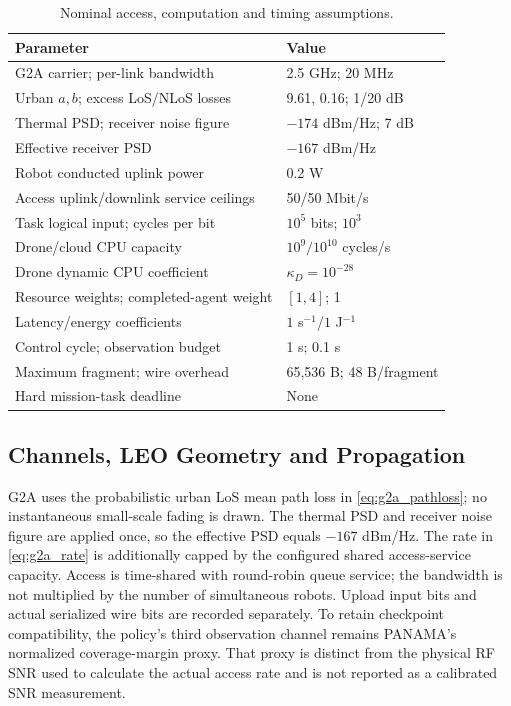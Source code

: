 \begin{table}[t]
\centering\caption{Nominal access, computation and timing assumptions.}
\label{tab:nominal_parameters}\scriptsize
\begin{tabular}{@{}p{}p{}@{}}
\toprule Parameter & Value\\\midrule
G2A carrier; per-link bandwidth & 2.5 GHz; 20 MHz\\
Urban $a,b$; excess LoS/NLoS losses & 9.61, 0.16; 1/20 dB\\
Thermal PSD; receiver noise figure & $-174$ dBm/Hz; 7 dB\\
Effective receiver PSD & $-167$ dBm/Hz\\
Robot conducted uplink power & 0.2 W\\
Access uplink/downlink service ceilings & 50/50 Mbit/s\\
Task logical input; cycles per bit & $10^5$ bits; $10^3$\\
Drone/cloud CPU capacity & $10^9/10^{10}$ cycles/s\\
Drone dynamic CPU coefficient & $\kappa_D=10^{-28}$\\
Resource weights; completed-agent weight & $[1,4]$; 1\\
Latency/energy coefficients & $1$ s$^{-1}$/$1$ J$^{-1}$\\
Control cycle; observation budget & 1 s; 0.1 s\\
Maximum fragment; wire overhead & 65,536 B; 48 B/fragment\\
Hard mission-task deadline & None\\\bottomrule
\end{tabular}
\end{table}

\subsection{Channels, LEO Geometry and Propagation}
G2A uses the probabilistic urban LoS mean path loss in \eqref{eq:g2a_pathloss}; no instantaneous small-scale fading is drawn. The thermal PSD and receiver noise figure are applied once, so the effective PSD equals $-167$ dBm/Hz. The rate in \eqref{eq:g2a_rate} is additionally capped by the configured shared access-service capacity. Access is time-shared with round-robin queue service; the bandwidth is not multiplied by the number of simultaneous robots. Upload input bits and actual serialized wire bits are recorded separately. To retain checkpoint compatibility, the policy's third observation channel remains PANAMA's normalized coverage-margin proxy. That proxy is distinct from the physical RF SNR used to calculate the actual access rate and is not reported as a calibrated SNR measurement.

